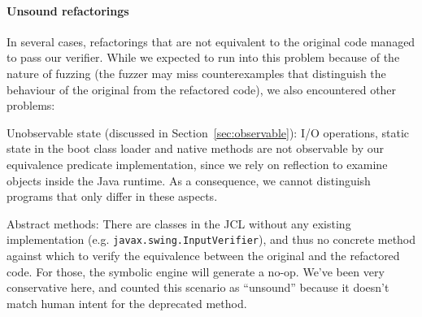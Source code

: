 \documentclass[sigconf]{acmart}
\begin{document}
\paragraph{Unsound refactorings}
%
%
In several cases, refactorings that are not equivalent to the original code managed to pass our verifier.
While we expected to run into this problem because of the nature of fuzzing (the fuzzer may miss counterexamples that distinguish the behaviour of the original from the refactored code),
we also encountered other problems:


Unobservable state (discussed in Section~\ref{sec:observable}): I/O operations, static state in the boot class loader and
native methods are not observable by our equivalence predicate implementation,
since we rely on reflection to examine objects inside the Java runtime. As
a consequence, we cannot distinguish programs that only differ in these aspects.

Abstract methods:
There are classes in the JCL without any
existing implementation (e.g. \lstinline{javax.swing.InputVerifier}), and thus no concrete
method against which to verify the equivalence between the original and the refactored code. For those, the symbolic engine will
generate a no-op. We've been very conservative here, and counted this scenario as ``unsound'' because
it doesn't match human intent for the deprecated method.
\end{document}
